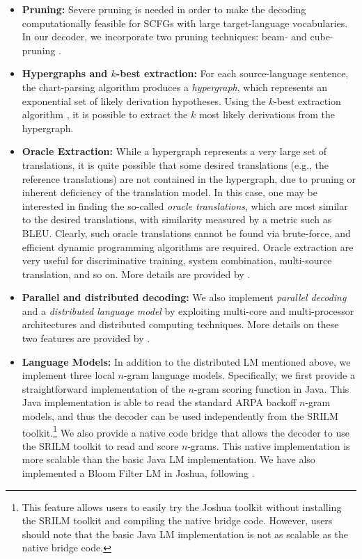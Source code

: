 \documentclass[11pt]{article}
\begin{document}
\begin{itemize}
\item \textbf{Pruning:} Severe pruning is needed in order to make the decoding computationally feasible for SCFGs with large target-language vocabularies. In our decoder, we incorporate two pruning techniques: beam- and cube-pruning \cite{Chiang2007}.

\item \textbf{Hypergraphs and $k$-best extraction:}
For each source-language sentence, the chart-parsing algorithm produces a \emph{hypergraph}, which represents an exponential set of likely derivation hypotheses. Using the $k$-best extraction algorithm \cite{Huang2005}, it is possible to extract the $k$ most likely derivations from the hypergraph.

\item \textbf{Oracle Extraction:} 
While a hypergraph represents a very large set of translations, it is quite possible that some desired translations (e.g., the reference translations) are not contained in the hypergraph, due to pruning or inherent deficiency of the translation model.
In this case, one may be interested in finding the so-called \emph{oracle translations}, which are most similar to the desired translations, with similarity measured by a metric such as BLEU.
Clearly, such oracle translations cannot be found via brute-force, and efficient dynamic programming algorithms are required.
Oracle extraction are very useful for discriminative training, system combination, multi-source translation, and so on. 
More details are provided by .

\item \textbf{Parallel and distributed decoding:}
We also implement \emph{parallel decoding} and a \emph{distributed language model} by exploiting multi-core and multi-processor architectures and distributed computing techniques. More details on these two features are provided by .

\item \textbf{Language Models:} In addition to the distributed LM mentioned above, we implement three local $n$-gram language models. Specifically, we first provide a straightforward implementation of the $n$-gram scoring function in Java. This Java implementation is able to read the standard ARPA backoff $n$-gram models, and thus the decoder can be used independently from the SRILM toolkit.\footnote{This feature allows users to easily try the Joshua toolkit without installing the SRILM toolkit and compiling the native bridge code. However, users should note that the basic Java LM implementation is not as scalable as the native bridge code.} We also provide a native code bridge that allows the decoder to use the SRILM toolkit to read and score $n$-grams. This native implementation is more scalable than the basic Java LM implementation. We have also implemented a Bloom Filter LM in Joshua, following .


\end{itemize}
\end{document}

